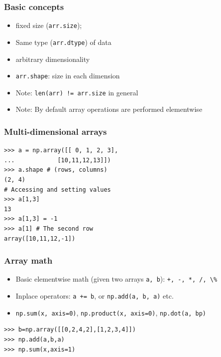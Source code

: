 \documentclass[14pt,compress]{beamer}
\newcommand{\typ}[1]{\lstinline{#1}}
\begin{document}
\begin{frame}
  \frametitle{Basic concepts}
  \begin{itemize}
  \item fixed size (\typ{arr.size});
  \item Same type (\typ{arr.dtype}) of data
  \item arbitrary dimensionality
  \item \typ{arr.shape}: size in each dimension
  \item \alert{Note:} \typ{len(arr) != arr.size} in general
  \item \alert{Note:} By default array operations are performed
    \alert{elementwise}
  \end{itemize}
\end{frame}



\begin{frame}[fragile]
  \frametitle{Multi-dimensional arrays}
\begin{lstlisting}
>>> a = np.array([[ 0, 1, 2, 3],
...            [10,11,12,13]])
>>> a.shape # (rows, columns)
(2, 4)
# Accessing and setting values
>>> a[1,3] 
13
>>> a[1,3] = -1
>>> a[1] # The second row
array([10,11,12,-1])
\end{lstlisting}
\end{frame}

\begin{frame}[fragile]
  \frametitle{Array math}
  \begin{itemize}
  \item Basic \alert{elementwise} math (given two arrays \typ{a, b}):
      \typ{+, -, *, /, \%}
  \item Inplace operators: \typ{a += b}, or \typ{np.add(a, b, a)} etc. 
  \item \typ{np.sum(x, axis=0)}, 
        \typ{np.product(x, axis=0)},
        \typ{np.dot(a, bp)}   
  \end{itemize}
\begin{lstlisting}
>>> b=np.array([[0,2,4,2],[1,2,3,4]])
>>> np.add(a,b,a)
>>> np.sum(x,axis=1)
\end{lstlisting}
\end{frame}
\end{document}
